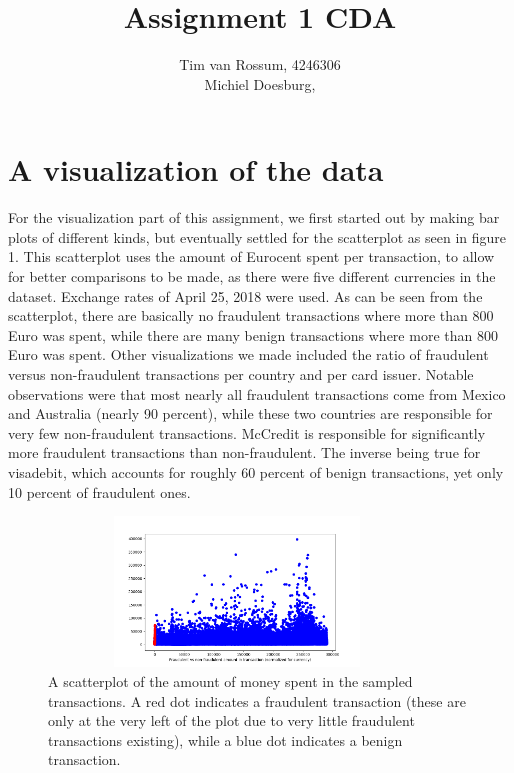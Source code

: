 \documentclass[]{article}
\title{Assignment 1 CDA}
\author{Tim van Rossum, 4246306\\
	Michiel Doesburg,}
\begin{document}
\maketitle

\section{A visualization of the data}
For the visualization part of this assignment, we first started out by making bar plots of different kinds, but eventually settled  for the scatterplot as seen in figure 1. This scatterplot uses the amount of Eurocent spent per transaction, to allow for better comparisons to be made, as there were five different currencies in the dataset. Exchange rates of April 25, 2018 were used. As can be seen from the scatterplot, there are basically no fraudulent transactions where more than 800 Euro was spent, while there are many benign transactions where more than 800 Euro was spent. Other visualizations we made included the ratio of fraudulent versus non-fraudulent transactions per country and per card issuer. Notable observations were that most nearly all fraudulent transactions come from Mexico and Australia (nearly 90 percent), while these two countries are responsible for very few non-fraudulent transactions. McCredit is responsible for significantly more fraudulent transactions than non-fraudulent. The inverse being true for visadebit, which accounts for roughly 60 percent of benign transactions, yet only 10 percent of fraudulent ones.
\begin{figure}[h!]
	\centering
	\includegraphics[width=10cm,height=4cm]{Visualizations/AmtFraudvsNonFraud2.png}
	\caption{A scatterplot of the amount of money spent in the sampled transactions. A red dot indicates a fraudulent transaction (these are only at the very left of the plot due to very little fraudulent transactions existing), while a blue dot indicates a benign transaction.}
\end{figure}
\clearpage
\end{document}
